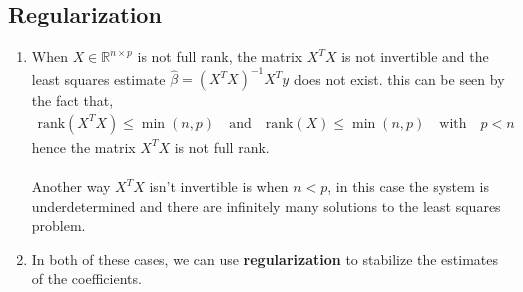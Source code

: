 \documentclass[letterpaper, 11pt]{article}
\newcommand{\R}{\mathbb{R}}	%
\newcommand{\1}{\mathds{1}}	%
\theoremstyle{definition}
\begin{document}
\subsection{Regularization}
\begin{enumerate}
    \item When $X \in \R^{n \times p}$ is not full rank, the matrix $X^T X$ is not invertible and the least squares estimate $\hat{\beta} = (X^T X)^{-1} X^T y$ does not exist.
    this can be seen by the fact that,
    \begin{align}
        \text{rank}(X^T X) \le \min(n,p) \quad \text{and} \quad \text{rank}(X) \le \min(n,p) \quad \text{with} \quad p < n
    \end{align}
    hence the matrix $X^T X$ is not full rank. \\ \\
    Another way $X^T X$ isn't invertible is when $n < p$, in this case the system 
    is underdetermined and there are infinitely many solutions to the least squares problem.
    \item In both of these cases, we can use \textbf{regularization} to stabilize the estimates of the coefficients.
\end{enumerate}
\end{document}
